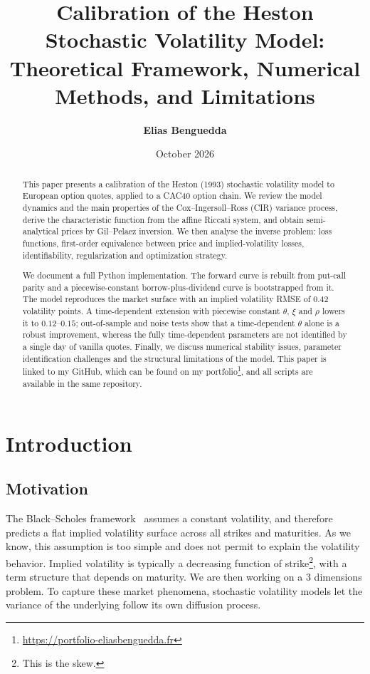 \documentclass[11pt,a4paper]{article}
\title{\textbf{Calibration of the Heston Stochastic Volatility Model:\\
Theoretical Framework, Numerical Methods, and Limitations}}
\author{\textbf{Elias Benguedda}}
\date{October 2026}
\theoremstyle{plain}
\theoremstyle{definition}
\begin{document}
\maketitle

\begin{abstract}
This paper presents a calibration of the Heston (1993) stochastic volatility model to European option quotes, applied to a CAC40 option chain. We review the model dynamics and the main properties of the Cox--Ingersoll--Ross (CIR) variance process, derive the characteristic function from the affine Riccati system, and obtain semi-analytical prices by Gil--Pelaez inversion. We then analyse the inverse problem: loss functions, first-order equivalence between price and implied-volatility losses, identifiability, regularization and optimization strategy.

We document a full Python implementation. The forward curve is rebuilt from put-call parity and a piecewise-constant borrow-plus-dividend curve is bootstrapped from it. The model reproduces the market surface with an implied volatility RMSE of $0.42$ volatility points. A time-dependent extension with piecewise constant $\theta$, $\xi$ and $\rho$ lowers it to $0.12$--$0.15$; out-of-sample and noise tests show that a time-dependent $\theta$ alone is a robust improvement, whereas the fully time-dependent parameters are not identified by a single day of vanilla quotes. Finally, we discuss numerical stability issues, parameter identification challenges and the structural limitations of the model. This paper is linked to my GitHub, which can be found on my portfolio\footnote{\url{https://portfolio-eliasbenguedda.fr}}, and all scripts are available in the same repository.
\end{abstract}

\clearpage

\tableofcontents
\newpage

\section{Introduction}
\label{sec:intro}

\subsection{Motivation}
The Black--Scholes framework~\cite{blackscholes} assumes a constant volatility, and therefore predicts a flat implied volatility surface across all strikes and maturities. As we know, this assumption is too simple and does not permit to explain the volatility behavior. Implied volatility is typically a decreasing function of strike\footnote{This is the skew.}, with a term structure that depends on maturity. We are then working on a 3 dimensions problem. To capture these market phenomena, stochastic volatility models let the variance of the underlying follow its own diffusion process.
\end{document}
